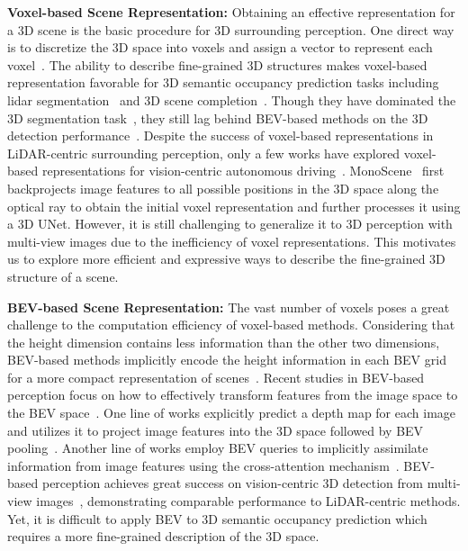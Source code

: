 \documentclass[10pt,twocolumn,letterpaper]{article}
\begin{document}
\textbf{Voxel-based Scene Representation:}
Obtaining an effective representation for a 3D scene is the basic procedure for 3D surrounding perception.
One direct way is to discretize the 3D space into voxels and assign a vector to represent each voxel~\cite{voxelnet,zhu2021cylindrical}.
The ability to describe fine-grained 3D structures makes voxel-based representation favorable for 3D semantic occupancy prediction tasks including lidar segmentation~\cite{amvnet,spvnas,af2s3net,cylinder3D,drinet++,ye2022lidarmultinet} and 3D scene completion~\cite{monoscene,lmscnet,dsketch,aicnet,js3c}.
Though they have dominated the 3D segmentation task~\cite{ye2022lidarmultinet}, they still lag behind BEV-based methods on the 3D detection performance~\cite{bevdepth}.
Despite the success of voxel-based representations in LiDAR-centric surrounding perception, only a few works have explored voxel-based representations for vision-centric autonomous driving~\cite{uvtr,monoscene}.
MonoScene~\cite{monoscene} first backprojects image features to all possible positions in the 3D space along the optical ray to obtain the initial voxel representation and further processes it using a 3D UNet.
However, it is still challenging to generalize it to 3D perception with multi-view images due to the inefficiency of voxel representations.
This motivates us to explore more efficient and expressive ways to describe the fine-grained 3D structure of a scene. 


\textbf{BEV-based Scene Representation:}
The vast number of voxels poses a great challenge to the computation efficiency of voxel-based methods.
Considering that the height dimension contains less information than the other two dimensions, BEV-based methods implicitly encode the height information in each BEV grid for a more compact representation of scenes~\cite{pointpillars}.
Recent studies in BEV-based perception focus on how to effectively transform features from the image space to the BEV space~\cite{caddn,bevdepth,lss,bevdet,beverse,bevformer}.
One line of works explicitly predict a depth map for each image and utilizes it to project image features into the 3D space followed by BEV pooling~\cite{caddn,bevdepth,bevfusion,bevfusion2,lss,bevdet,beverse}.
Another line of works employ BEV queries to implicitly assimilate information from image features using the cross-attention mechanism~\cite{bevformer,polarformer}.
BEV-based perception achieves great success on vision-centric 3D detection from multi-view images~\cite{bevdepth}, demonstrating comparable performance to LiDAR-centric methods.
Yet, it is difficult to apply BEV to 3D semantic occupancy prediction which requires a more fine-grained description of the 3D space.
\end{document}
